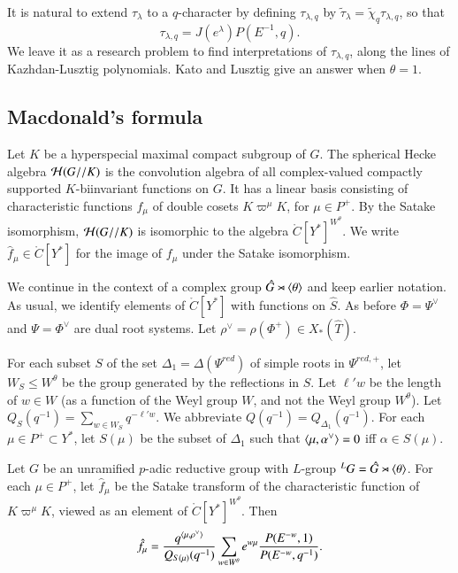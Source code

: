 It is natural to extend $\tau_\lambda$ to a $q$-character by defining
$\tau_{\lambda,q}$ by $\tilde \tau_\lambda = \tilde
\chi_q\tau_{\lambda,q} $, so that
\begin{equation}\label{eqn:tauq}
\tau_{\lambda,q} = J(e^\lambda) P(E^{-1},q).
\end{equation}
We leave it as a research problem to find interpretations of
$\tau_{\lambda,q}$, along the lines of Kazhdan-Lusztig polynomials.
Kato and Lusztig give an answer when $\theta=1$.


\subsection{Macdonald's formula}\label{sec:macdonald}

Let $K$ be a hyperspecial maximal compact subgroup of $G$.  The
spherical Hecke algebra $\mathcal H(G//K)$ is the convolution
algebra of all complex-valued compactly supported $K$-biinvariant
functions on $G$.  It has a linear basis consisting of characteristic
functions $f_\mu$ of double cosets $K\varpi^\mu K$, for $\mu\in P^+$.
By the Satake isomorphism, $\mathcal H(G//K)$ is isomorphic to the algebra
$\ring{C}[Y^*]^{W^\theta}$.  We write $\hat f_\mu\in \ring{C}[Y^*]$
for the image of $f_\mu$ under the Satake isomorphism.

We continue in the context of a complex group $\hat G \rtimes
\langle{\theta}\rangle$ and keep earlier notation.  As usual, we identify
elements of $\ring{C}[Y^*]$ with functions on $\hat S$.  As before
$\Phi=\Psi^\vee$ and $\Psi = \Phi^\vee$ are dual root systems.  Let
$\rho^\vee = \rho(\Phi^+)\in X_*(\hat T)$.

For each subset $S$ of the set $\Delta_1=\Delta(\Psi^{red})$ of simple
roots in $\Psi^{red,+}$, let $W_S\le W^\theta$ be the group generated
by the reflections in $S$.  Let $\ell' w$ be the length of $w\in W$
(as a function of the Weyl group $W$, and not the Weyl group
$W^\theta$).  Let $Q_S(q^{-1}) = \sum_{w\in W_S} q^{-\ell'w}$.  We
abbreviate $Q(q^{-1}) = Q_{\Delta_1}(q^{-1})$.  For each $\mu\in
P^+\subset Y^*$, let $S(\mu)$ be the subset of $\Delta_1$ such that
$\langle{\mu,\alpha^\vee}\rangle=0$ iff $\alpha\in S(\mu)$.

\begin{theorem}\label{thm:macdonald}
  Let $G$ be an unramified $p$-adic reductive group with $L$-group
  ${}^LG = \hat G \rtimes \langle{\theta}\rangle$.  For each $\mu\in P^+$, let
  $\hat f_\mu$ be the Satake transform of the characteristic function
  of $K\varpi^\mu K$, viewed as an element of
  $\ring{C}[Y^*]^{W^\theta}$.  Then
\[
\hat f_\mu = \frac{q^{\langle{\mu,\rho^\vee}\rangle}}{ Q_{S(\mu)}(q^{-1})} 
\sum_{w\in W^\theta} e^{w\mu} \frac{P(E^{-w},1)}{P(E^{-w},q^{-1})}.
\]
\end{theorem}

